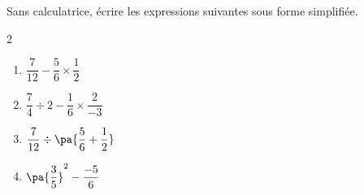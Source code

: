 \begin{exo}{}
	Sans calculatrice, écrire les expressions suivantes sous forme simplifiée.
	\vspace*{-2mm}\begin{multicols}{2}
		\begin{enumerate}[itemsep=2mm]
			\item $\dfrac{7}{12} - \dfrac{5}{6} \times \dfrac{1}{2}$
			\item $\dfrac{7}{4} \div 2 - \dfrac{1}{6} \times \dfrac{2}{-3}$
			\item $\dfrac{7}{12} \div \pa{\dfrac{5}{6} + \dfrac{1}{2}}$
			\item $\pa{\dfrac{3}{5}}^2 - \dfrac{-5}{6}$
		\end{enumerate}
	\end{multicols}\vspace*{-2mm}
\end{exo}
